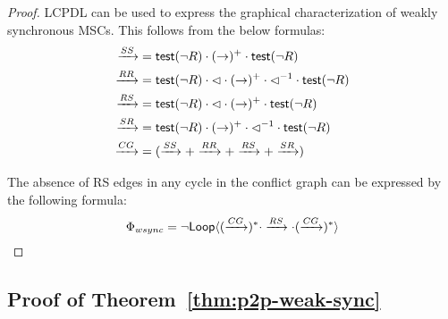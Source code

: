 \documentclass[a4paper,UKenglish,cleveref, autoref, thm-restate]{lipics-v2021}
\begin{document}
\begin{proof}
LCPDL can be used to express the graphical characterization of weakly synchronous MSCs. This follows from the below formulas:
\begin{align*}
	\xrightarrow{SS} & = \textsf{test}(\neg R) \cdot (\to)^+ \cdot \textsf{test}(\neg R) \\
	\xrightarrow{RR} & = \textsf{test}(\neg R) \cdot \lhd \cdot (\to)^+ \cdot \lhd^{-1} \cdot \textsf{test}(\neg R) \\
	\xrightarrow{RS} & = \textsf{test}(\neg R) \cdot \lhd \cdot (\to)^+ \cdot \textsf{test}(\neg R) \\
	\xrightarrow{SR} & = \textsf{test}(\neg R) \cdot (\to)^+ \cdot \lhd^{-1} \cdot \textsf{test}(\neg R) \\
	\xrightarrow{CG} & = (\xrightarrow{SS} + \xrightarrow{RR} + \xrightarrow{RS} + \xrightarrow{SR})
\end{align*}

The absence of RS edges in any cycle in the conflict graph can be expressed by the following formula:
\[
\Phi_{wsync} = \neg \textsf{Loop}\langle (\xrightarrow{CG})^*\cdot \xrightarrow{RS} \cdot (\xrightarrow{CG})^* \rangle
\qedhere
\]
\end{proof}


\subsection{Proof of Theorem~\ref{thm:p2p-weak-sync}}
\label{app:p2p-weak-sync}

\ppweaksynch*
\end{document}
